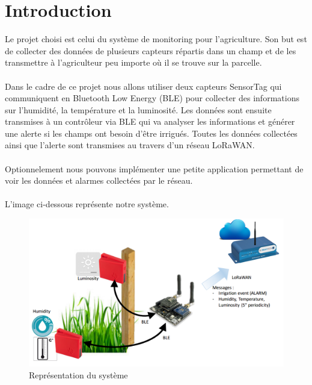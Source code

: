 \newpage
\section{Introduction}
Le projet choisi est celui du système de monitoring pour l'agriculture. Son but est de collecter des données de plusieurs capteurs répartis dans un champ et de les transmettre à l'agriculteur peu importe où il se trouve sur la parcelle.\\\\
Dans le cadre de ce projet nous allons utiliser deux capteurs SensorTag qui communiquent en Bluetooth Low Energy (BLE) pour collecter des informations sur l'humidité, la température et la luminosité. Les données sont ensuite transmises à un contrôleur via BLE qui va analyser les informations et générer une alerte si les champs ont besoin d'être irrigués. Toutes les données collectées ainsi que l'alerte sont transmises au travers d'un réseau LoRaWAN.\\\\
Optionnelement nous pouvons implémenter une petite application permettant de voir les données et alarmes collectées par le réseau.\\\\
L'image ci-dessous représente notre système.
\begin{figure}[H]
	\begin{center}
		\includegraphics[width=17cm]{img/intro.png}
		\caption{Représentation du système}
		\label{intro}
	\end{center}
\end{figure}
